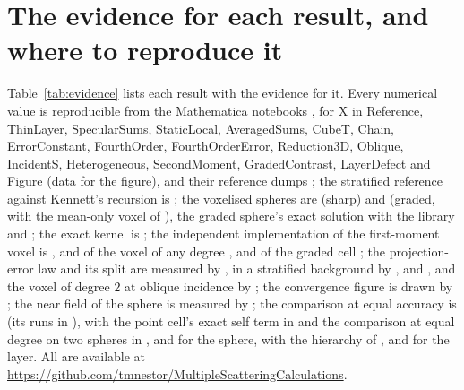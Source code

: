 \documentclass[11pt,a4paper]{article}
\begin{document}
\FloatBarrier

\section{The evidence for each result, and where to reproduce it}\label{app:evidence}

Table~\ref{tab:evidence} lists each result with the evidence for it. Every numerical value is reproducible from the Mathematica notebooks
, for X in Reference, ThinLayer, SpecularSums,
StaticLocal, AveragedSums, CubeT, Chain, ErrorConstant, FourthOrder, FourthOrderError, Reduction3D,
Oblique, IncidentS, Heterogeneous, SecondMoment, GradedContrast, LayerDefect and Figure (data for the figure), and their reference dumps
; the stratified reference against Kennett's recursion is
; the voxelised spheres are
 (sharp) and  (graded, with the mean-only voxel of ), the graded sphere's exact solution
 with the library 
and ;
the exact kernel is
; the independent implementation of the
first-moment voxel is , and of the voxel of any
degree , and of the graded cell
; the projection-error law and its split are measured by
, in a stratified background by
,
 and , and the voxel of degree $2$ at oblique incidence by
; the convergence figure is drawn by
; the near field of the sphere is measured by
; the comparison at equal accuracy is
 (its runs in ), with
the point cell's exact self term in  and the comparison at equal
degree on two spheres in ,
 and  for the sphere, with the
hierarchy of , and
 for the layer. All are available at
\url{https://github.com/tmnestor/MultipleScatteringCalculations}.
\end{document}
